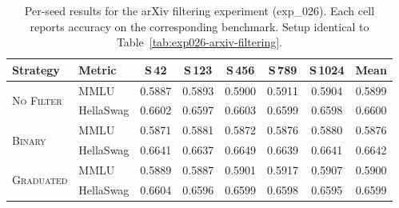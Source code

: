 \begin{table}[t]
\centering
\small
\caption{
  Per-seed results for the arXiv filtering experiment (exp\_026).
  Each cell reports accuracy on the corresponding benchmark.
  Setup identical to Table~\ref{tab:exp026-arxiv-filtering}.
}
\label{tab:exp026-per-seed}
\begin{tabular}{ll ccccc c}
\toprule
\textbf{Strategy} & \textbf{Metric}
  & \textbf{S\,42} & \textbf{S\,123} & \textbf{S\,456}
  & \textbf{S\,789} & \textbf{S\,1024}
  & \textbf{Mean} \\
\midrule
\multirow{2}{*}{\textsc{No Filter}}
  & MMLU      & 0.5887 & 0.5893 & 0.5900 & 0.5911 & 0.5904 & 0.5899 \\
  & HellaSwag & 0.6602 & 0.6597 & 0.6603 & 0.6599 & 0.6598 & 0.6600 \\
\midrule
\multirow{2}{*}{\textsc{Binary}}
  & MMLU      & 0.5871 & 0.5881 & 0.5872 & 0.5876 & 0.5880 & 0.5876 \\
  & HellaSwag & 0.6641 & 0.6637 & 0.6649 & 0.6639 & 0.6641 & 0.6642 \\
\midrule
\multirow{2}{*}{\textsc{Graduated}}
  & MMLU      & 0.5889 & 0.5887 & 0.5901 & 0.5917 & 0.5907 & 0.5900 \\
  & HellaSwag & 0.6604 & 0.6596 & 0.6599 & 0.6598 & 0.6595 & 0.6599 \\
\bottomrule
\end{tabular}
\end{table}
